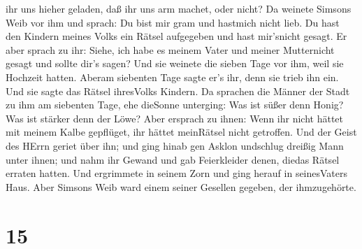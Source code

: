 ihr uns hieher geladen, daß ihr uns arm machet, oder nicht?
 Da weinete Simsons Weib vor ihm und sprach: Du bist mir
gram und hastmich nicht lieb. Du hast den Kindern meines Volks ein
Rätsel aufgegeben und hast mir'snicht gesagt. Er aber sprach zu ihr:
Siehe, ich habe es meinem Vater und meiner Mutternicht gesagt und sollte
dir's sagen?  Und sie weinete die sieben Tage vor ihm, weil
sie Hochzeit hatten. Aberam siebenten Tage sagte er's ihr, denn sie
trieb ihn ein. Und sie sagte das Rätsel ihresVolks Kindern.
 Da sprachen die Männer der Stadt zu ihm am siebenten Tage,
ehe dieSonne unterging: Was ist süßer denn Honig? Was ist stärker denn
der Löwe? Aber ersprach zu ihnen: Wenn ihr nicht hättet mit meinem Kalbe
gepflüget, ihr hättet meinRätsel nicht getroffen.  Und der
Geist des HErrn geriet über ihn; und ging hinab gen Asklon undschlug
dreißig Mann unter ihnen; und nahm ihr Gewand und gab Feierkleider
denen, diedas Rätsel erraten hatten. Und ergrimmete in seinem Zorn und
ging herauf in seinesVaters Haus.  Aber Simsons Weib ward
einem seiner Gesellen gegeben, der ihmzugehörte.

\hypertarget{section-14}{%
\section{15}\label{section-14}}


